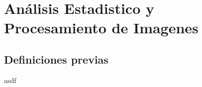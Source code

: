 \chapter{Análisis Estadistico y Procesamiento de Imagenes }\label{chap2}


\section{Definiciones previas}

asdf